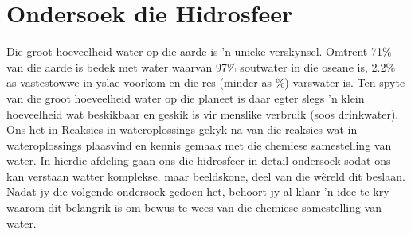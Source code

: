 \section{Ondersoek die Hidrosfeer}
            \nopagebreak

Die groot hoeveelheid water op die aarde is   'n unieke verskynsel. Omtrent 71\% van die aarde is bedek met water waarvan 97\% soutwater in die oseane is, 2.2\% as vastestowwe in yslae voorkom en die res (minder as \%) varswater is. Ten spyte van die groot hoeveelheid water op die planeet is daar egter slegs   'n klein hoeveelheid wat beskikbaar en geskik is vir menslike verbruik (soos drinkwater). 
Ons het in Reaksies in wateroplossings gekyk na van die reaksies wat in wateroplossings plaasvind en kennis gemaak met die chemiese samestelling van water. In hierdie afdeling gaan ons die hidrosfeer in detail ondersoek sodat ons kan verstaan watter komplekse, maar beeldskone, deel van die wêreld dit beslaan. Nadat jy die volgende ondersoek gedoen het, behoort jy al klaar   'n idee te kry waarom dit belangrik is om bewus te wees van die chemiese samestelling van water.
\label{m38138*secfhsst!!!underscore!!!id86}
